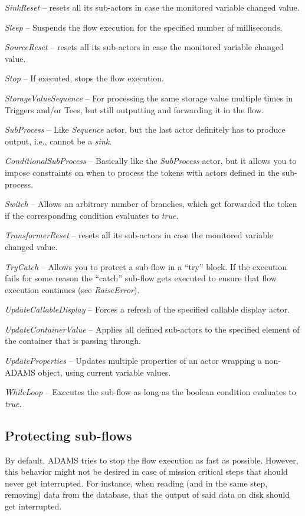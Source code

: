 \begin{tight_itemize}
	\item \textit{SinkReset} -- resets all its sub-actors in case the monitored
	variable changed value.
	\item \textit{Sleep} -- Suspends the flow execution for the specified number of
	milliseconds.
	\item \textit{SourceReset} -- resets all its sub-actors in case the monitored
	variable changed value.
	\item \textit{Stop} -- If executed, stops the flow execution.
	\item \textit{StorageValueSequence} -- For processing the same storage value
	multiple times in Triggers and/or Tees, but still outputting and forwarding
	it in the flow.
	\item \textit{SubProcess} -- Like \textit{Sequence} actor, but the last actor
	definitely has to produce output, i.e., cannot be a \textit{sink}.
	\item \textit{ConditionalSubProcess} -- Basically like the \textit{SubProcess}
	actor, but it allows you to impose constraints on when to process the tokens
	with actors defined in the sub-process.
	\item \textit{Switch} -- Allows an arbitrary number of branches, which get
	forwarded the token if the corresponding condition evaluates to \textit{true}.
	\item \textit{TransformerReset} -- resets all its sub-actors in case the monitored
	variable changed value.
	\item \textit{TryCatch} -- Allows you to protect a sub-flow in a ``try''
	block. If the execution fails for some reason the ``catch'' sub-flow gets
	executed to ensure that flow execution continues (see \textit{RaiseError}).
	\item \textit{UpdateCallableDisplay} -- Forces a refresh of the specified
	callable display actor.
	\item \textit{UpdateContainerValue} -- Applies all defined sub-actors to the
	specified element of the container that is passing through.
	\item \textit{UpdateProperties} -- Updates multiple properties of an actor
	wrapping a non-ADAMS object, using current variable values.
	\item \textit{WhileLoop} -- Executes the sub-flow as long as the boolean
	condition evaluates to \textit{true}.
\end{tight_itemize}

\subsection{Protecting sub-flows}
By default, ADAMS tries to stop the flow execution as fast as possible. However,
this behavior might not be desired in case of mission critical steps that should
never get interrupted. For instance, when reading (and in the same step, removing)
data from the database, that the output of said data on disk should get 
interrupted. 

